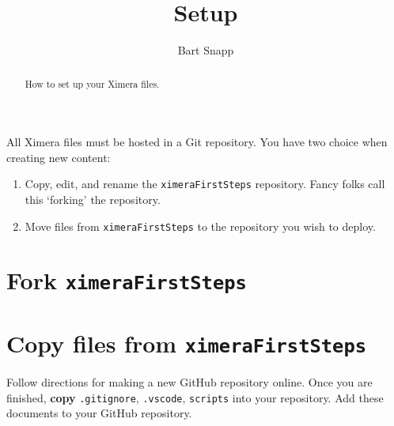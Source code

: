 \documentclass{ximera}
\title{Setup}
\author{Bart Snapp}
\begin{document}
\begin{abstract}
    How to set up your Ximera files.
\end{abstract}
\maketitle

All Ximera files must be hosted in a Git repository. You have two choice when creating new content: 
\begin{enumerate}
    \item Copy, edit, and rename the \texttt{ximeraFirstSteps} repository. Fancy folks call this `forking' the repository.
    \item Move files from \texttt{ximeraFirstSteps} to the repository you wish to deploy.
\end{enumerate}


\section{Fork \texttt{ximeraFirstSteps}}


\section{Copy files from \texttt{ximeraFirstSteps}}
 Follow directions for making a new GitHub repository online.
Once you are finished, \textbf{copy} \verb|.gitignore|, \verb|.vscode|, \verb|scripts| into your repository. 
Add these documents to your GitHub repository. 
\end{document}
